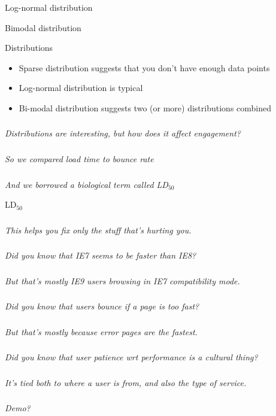 \documentclass{beamer}
\newcommand{\innersplash}[1]{
  \begin{center}
    \Large \textrm{\textit{ #1 } }
  \end{center}
}
\newcommand{\splashslide}[2][{}]{
  \begin{frame}
  \frametitle{#1}
  \innersplash{#2}
  \end{frame}
}
\newcommand{\textsubscript}[1]{\ensuremath{_{\textrm{#1}}}}
\begin{document}
\begin{frame}{Log-normal distribution}
\end{frame}

\begin{frame}{Bimodal distribution}
\end{frame}

\begin{frame}{Distributions}
\begin{itemize}
  \item Sparse distribution suggests that you don't have enough data points
  \item Log-normal distribution is typical
  \item Bi-modal distribution suggests two (or more) distributions combined
\end{itemize}
\end{frame}

\splashslide{Distributions are interesting, but how does it affect engagement?}

\splashslide{So we compared load time to bounce rate}

\splashslide{And we borrowed a biological term called LD\textsubscript{50}}

\begin{frame}{LD\textsubscript{50}}
\end{frame}

\splashslide{This helps you fix only the stuff that's hurting you.}

\splashslide{Did you know that IE7 seems to be faster than IE8?}
\splashslide{But that's mostly IE9 users browsing in IE7 compatibility mode.}

\splashslide{Did you know that users bounce if a page is too fast?}
\splashslide{But that's mostly because error pages are the fastest.}

\splashslide{Did you know that user patience wrt performance is a cultural thing?}
\splashslide{It's tied both to where a user is from, and also the type of service.}

\splashslide{Demo?}
\end{document}
